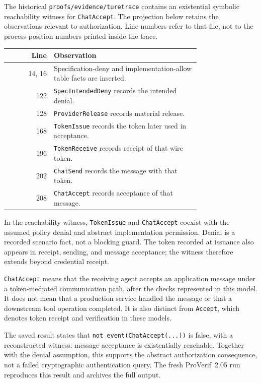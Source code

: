 The historical \texttt{proofs/evidence/turetrace} contains an existential
symbolic reachability witness for \texttt{ChatAccept}. The projection below
retains the observations relevant to authorization. Line numbers refer to that file,
not to the process-position numbers printed inside the trace.
\begin{center}
\begin{tabular}{rp{0.76\linewidth}}
\hline
Line & Observation \\
\hline
14, 16 & Specification-deny and implementation-allow table facts are inserted. \\
122 & \texttt{SpecIntendedDeny} records the intended denial. \\
128 & \texttt{ProviderRelease} records material release. \\
168 & \texttt{TokenIssue} records the token later used in acceptance. \\
196 & \texttt{TokenReceive} records receipt of that wire token. \\
202 & \texttt{ChatSend} records the message with that token. \\
208 & \texttt{ChatAccept} records acceptance of that message. \\
\hline
\end{tabular}
\end{center}

In the reachability witness, \texttt{TokenIssue} and \texttt{ChatAccept}
coexist with the assumed policy denial and abstract implementation permission.
Denial is a recorded scenario fact, not a blocking guard.
The token recorded at issuance also appears in receipt, sending, and message
acceptance; the witness therefore extends beyond credential receipt.

\texttt{ChatAccept} means that the receiving agent accepts an application
message under a token-mediated communication path, after the checks represented
in this model. It does not mean that a production service handled the message
or that a downstream tool operation completed. It is also distinct from
\texttt{Accept}, which denotes token receipt and verification in these models.

The saved result states that \texttt{not event(ChatAccept(...))} is false,
with a reconstructed witness: message acceptance is existentially reachable.
Together with the denial assumption, this supports the abstract authorization
consequence, not a failed cryptographic authentication query. The fresh
ProVerif~2.05 run reproduces this result and archives the full output.

